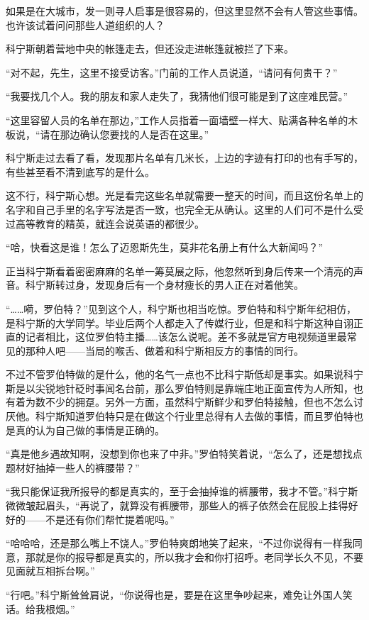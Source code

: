 如果是在大城市，发一则寻人启事是很容易的，但这里显然不会有人管这些事情。也许该试着问问那些人道组织的人？

科宁斯朝着营地中央的帐篷走去，但还没走进帐篷就被拦了下来。

“对不起，先生，这里不接受访客。”门前的工作人员说道，“请问有何贵干？”

“我要找几个人。我的朋友和家人走失了，我猜他们很可能是到了这座难民营。”

“这里容留人员的名单在那边，”工作人员指着一面墙壁一样大、贴满各种名单的木板说，“请在那边确认您要找的人是否在这里。”

科宁斯走过去看了看，发现那片名单有几米长，上边的字迹有打印的也有手写的，有些甚至看不清到底写的是什么。

这不行，科宁斯心想。光是看完这些名单就需要一整天的时间，而且这份名单上的名字和自己手里的名字写法是否一致，也完全无从确认。这里的人们可不是什么受过高等教育的精英，就连会说英语的都很少。

“哈，快看这是谁！怎么了迈恩斯先生，莫非花名册上有什么大新闻吗？”

正当科宁斯看着密密麻麻的名单一筹莫展之际，他忽然听到身后传来一个清亮的声音。科宁斯转过身，发现身后有一个身材瘦长的男人正在对着他笑。

“……嗬，罗伯特？”见到这个人，科宁斯也相当吃惊。罗伯特和科宁斯年纪相仿，是科宁斯的大学同学。毕业后两个人都走入了传媒行业，但是和科宁斯这种自诩正直的记者相比，这位罗伯特主播……该怎么说呢。差不多就是官方电视频道里最常见的那种人吧——当局的喉舌、做着和科宁斯相反方的事情的同行。

不过不管罗伯特做的是什么，他的名气一点也不比科宁斯低却是事实。如果说科宁斯是以尖锐地针砭时事闻名台前，那么罗伯特则是靠端庄地正面宣传为人所知，也有着为数不少的拥趸。另外一方面，虽然科宁斯鲜少和罗伯特接触，但也不怎么讨厌他。科宁斯知道罗伯特只是在做这个行业里总得有人去做的事情，而且罗伯特也是真的认为自己做的事情是正确的。

“真是他乡遇故知啊，没想到你也来了中非。”罗伯特笑着说，“怎么了，还是想找点题材好抽掉一些人的裤腰带？”

“我只能保证我所报导的都是真实的，至于会抽掉谁的裤腰带，我才不管。”科宁斯微微皱起眉头，“再说了，就算没有裤腰带，那些人的裤子依然会在屁股上挂得好好的——不是还有你们帮忙提着呢吗。”

“哈哈哈，还是那么嘴上不饶人。”罗伯特爽朗地笑了起来，“不过你说得有一样我同意，那就是你的报导都是真实的，所以我才会和你打招呼。老同学长久不见，不要见面就互相拆台啊。”

“行吧。”科宁斯耸耸肩说，“你说得也是，要是在这里争吵起来，难免让外国人笑话。给我根烟。”

